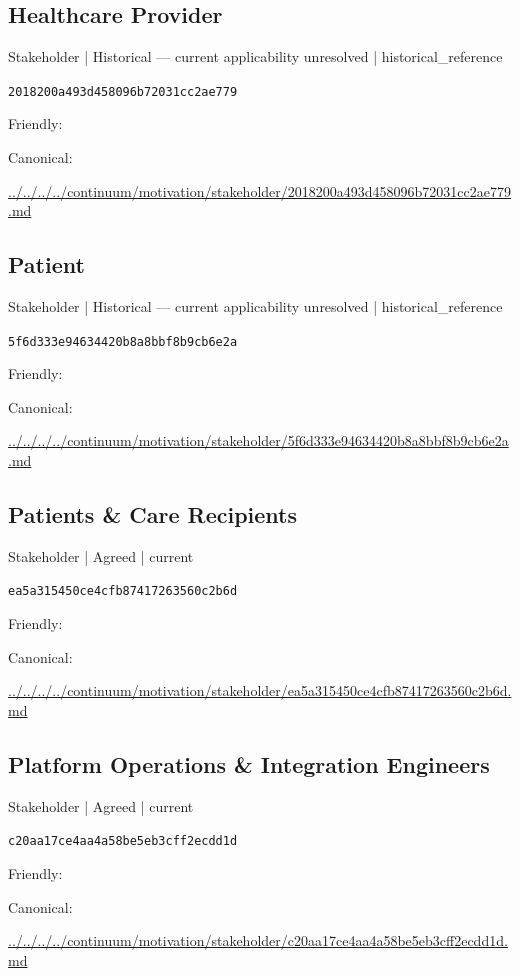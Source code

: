 \documentclass[10pt,a4paper]{article}
\begin{document}
\subsection*{Healthcare Provider}
{\small Stakeholder | Historical — current applicability unresolved | historical\_reference}\par
\texttt{2018200a493d458096b72031cc2ae779}\par
Friendly: \par
Canonical: \par
{\footnotesize\url{../../../../continuum/motivation/stakeholder/2018200a493d458096b72031cc2ae779.md}}\par
\subsection*{Patient}
{\small Stakeholder | Historical — current applicability unresolved | historical\_reference}\par
\texttt{5f6d333e94634420b8a8bbf8b9cb6e2a}\par
Friendly: \par
Canonical: \par
{\footnotesize\url{../../../../continuum/motivation/stakeholder/5f6d333e94634420b8a8bbf8b9cb6e2a.md}}\par
\subsection*{Patients \& Care Recipients}
{\small Stakeholder | Agreed | current}\par
\texttt{ea5a315450ce4cfb87417263560c2b6d}\par
Friendly: \par
Canonical: \par
{\footnotesize\url{../../../../continuum/motivation/stakeholder/ea5a315450ce4cfb87417263560c2b6d.md}}\par
\subsection*{Platform Operations \& Integration Engineers}
{\small Stakeholder | Agreed | current}\par
\texttt{c20aa17ce4aa4a58be5eb3cff2ecdd1d}\par
Friendly: \par
Canonical: \par
{\footnotesize\url{../../../../continuum/motivation/stakeholder/c20aa17ce4aa4a58be5eb3cff2ecdd1d.md}}\par
\end{document}
